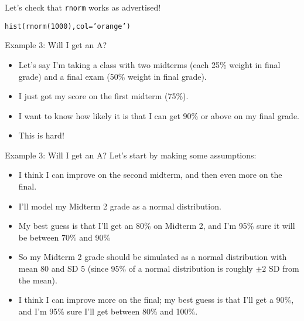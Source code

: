 \documentclass{beamer}\usepackage[]{graphicx}\usepackage[]{color}
\makeatletter
\newcommand{\hlnum}[1]{\textcolor[rgb]{0.824,0.412,0.118}{#1}}%
\newcommand{\hlstr}[1]{\textcolor[rgb]{1,0.894,0.71}{#1}}%
\newcommand{\hlstd}[1]{\textcolor[rgb]{1,0.894,0.769}{#1}}%
\newcommand{\hlkwc}[1]{\textcolor[rgb]{0.78,0.941,0.545}{#1}}%
\newcommand{\hlkwd}[1]{\textcolor[rgb]{1,0.78,0.769}{#1}}%
\newenvironment{kframe}{%
 \def\at@end@of@kframe{}%
 \ifinner\ifhmode%
  \def\at@end@of@kframe{\end{minipage}}%
  \begin{minipage}{\columnwidth}%
 \fi\fi%
 \def\FrameCommand##1{\hskip\@totalleftmargin \hskip-\fboxsep
 \colorbox{shadecolor}{##1}\hskip-\fboxsep
     \hskip-\linewidth \hskip-\@totalleftmargin \hskip\columnwidth}%
 \MakeFramed {\advance\hsize-\width
   \@totalleftmargin\z@ \linewidth\hsize
   \@setminipage}}%
 {\par\unskip\endMakeFramed%
 \at@end@of@kframe}
\newenvironment{knitrout}{}{} %
\makeatother
\begin{document}
\begin{darkframes}
    \begin{frame}
      Let's check that \texttt{rnorm} works as advertised!

\begin{knitrout}
\begin{kframe}
\begin{alltt}
\hlkwd{hist}\hlstd{(}\hlkwd{rnorm}\hlstd{(}\hlnum{1000}\hlstd{),} \hlkwc{col}\hlstd{=}\hlstr{'orange'}\hlstd{)}
\end{alltt}
\end{kframe}


\end{knitrout}
    \end{frame}

    \begin{frame}{Example 3: Will I get an A?}
      \begin{itemize}[<+->]
        \item Let's say I'm taking a class with two midterms (each 25\% weight in final grade) and a final exam (50\% weight in final grade).
        \item I just got my score on the first midterm (75\%).
        \item I want to know how likely it is that I can get 90\% or above on my final grade.
        \item This is hard!
      \end{itemize}
    \end{frame}

    \begin{frame}{Example 3: Will I get an A?}
      Let's start by making some assumptions:
      \begin{itemize}[<+->]
        \item I think I can improve on the second midterm, and then even more on the final.
        \item I'll model my Midterm 2 grade as a normal distribution.
        \item My best guess is that I'll get an 80\% on Midterm 2, and I'm 95\% sure it will be between 70\% and 90\%
        \item So my Midterm 2 grade should be simulated as a normal distribution with mean 80 and SD 5 (since 95\% of a normal distribution is roughly $\pm 2$ SD from the mean).
        \item I think I can improve more on the final; my best guess is that I'll get a 90\%, and I'm 95\% sure I'll get between 80\% and 100\%.
      \end{itemize}
      \lc
    \end{frame}


\end{darkframes}
\end{document}
